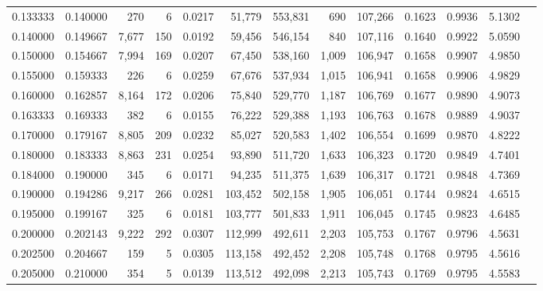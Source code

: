 \begin{tabular}{rrrrrrrrrrrrr}
0.133333 & 0.140000 &    270 &     6 &                                     0.0217 &  51,779 & 553,831 &     690 & 107,266 & 0.1623 & 0.9936 & 5.1302 \\
0.140000 & 0.149667 &  7,677 &   150 &                                     0.0192 &  59,456 & 546,154 &     840 & 107,116 & 0.1640 & 0.9922 & 5.0590 \\
0.150000 & 0.154667 &  7,994 &   169 &                                     0.0207 &  67,450 & 538,160 &   1,009 & 106,947 & 0.1658 & 0.9907 & 4.9850 \\
0.155000 & 0.159333 &    226 &     6 &                                     0.0259 &  67,676 & 537,934 &   1,015 & 106,941 & 0.1658 & 0.9906 & 4.9829 \\
0.160000 & 0.162857 &  8,164 &   172 &                                     0.0206 &  75,840 & 529,770 &   1,187 & 106,769 & 0.1677 & 0.9890 & 4.9073 \\
0.163333 & 0.169333 &    382 &     6 &                                     0.0155 &  76,222 & 529,388 &   1,193 & 106,763 & 0.1678 & 0.9889 & 4.9037 \\
0.170000 & 0.179167 &  8,805 &   209 &                                     0.0232 &  85,027 & 520,583 &   1,402 & 106,554 & 0.1699 & 0.9870 & 4.8222 \\
0.180000 & 0.183333 &  8,863 &   231 &                                     0.0254 &  93,890 & 511,720 &   1,633 & 106,323 & 0.1720 & 0.9849 & 4.7401 \\
0.184000 & 0.190000 &    345 &     6 &                                     0.0171 &  94,235 & 511,375 &   1,639 & 106,317 & 0.1721 & 0.9848 & 4.7369 \\
0.190000 & 0.194286 &  9,217 &   266 &                                     0.0281 & 103,452 & 502,158 &   1,905 & 106,051 & 0.1744 & 0.9824 & 4.6515 \\
0.195000 & 0.199167 &    325 &     6 &                                     0.0181 & 103,777 & 501,833 &   1,911 & 106,045 & 0.1745 & 0.9823 & 4.6485 \\
0.200000 & 0.202143 &  9,222 &   292 &                                     0.0307 & 112,999 & 492,611 &   2,203 & 105,753 & 0.1767 & 0.9796 & 4.5631 \\
0.202500 & 0.204667 &    159 &     5 &                                     0.0305 & 113,158 & 492,452 &   2,208 & 105,748 & 0.1768 & 0.9795 & 4.5616 \\
0.205000 & 0.210000 &    354 &     5 &                                     0.0139 & 113,512 & 492,098 &   2,213 & 105,743 & 0.1769 & 0.9795 & 4.5583 \\

\end{tabular}
